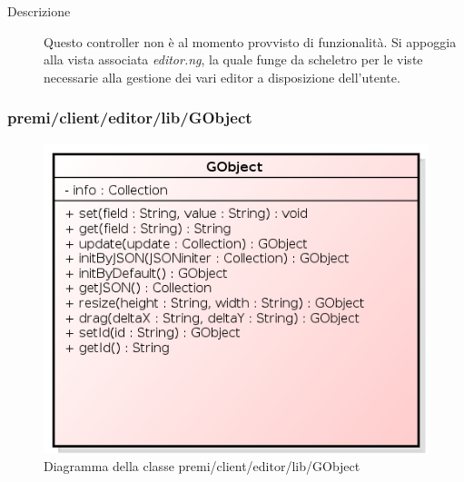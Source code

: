 \begin{description}
\item[Descrizione] \hfill
	Questo controller non è al momento provvisto di funzionalità. Si appoggia alla vista associata \textit{editor.ng}, la quale funge da scheletro per le viste necessarie alla gestione dei vari editor a disposizione dell'utente. 
\end{description}


\subsubsection{premi/client/editor/lib/GObject}
\begin{figure}[h]
\begin{center}
\includegraphics[scale=0.40]{img/diacla/GObject.png}
\caption{Diagramma della classe premi/client/editor/lib/GObject}
\end{center}
\end{figure}

